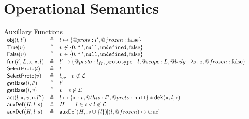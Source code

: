 \documentclass[a4paper]{article}
\begin{document}
\section{Operational Semantics}
\newcommand{\auxf}[2]{#1 & \triangleq & #2}
\begin{display}{Auxillary Functions}
  $\begin{array}{lcl}
  \auxf{\obj(l,l')}{l \pointsto \{@proto: l', @frozen: \false\}}\\
  \auxf{\istrue(v)}{v\not\in\{0,\emptystr,\nil,\und,\false\}}\\
  \auxf{\isfalse(v)}{v\in   \{0,\emptystr,\nil,\und,\false\}}\\
  \auxf{\fun(l',L,\js x,\js e,l)}{l'\mapsto\{@proto: \lfp, \js{prototype}:
    l, @scope: L, @body: \lambda \js{x.e}, @frozen: \false\}}\\
  \auxf{\objOrGlob(l)}{l}\\
  \auxf{\objOrGlob(v)}{\lop \quad v\not\in\loc}\\
  \auxf{\getBase(l,l')}{l'}\\
  \auxf{\getBase(l,v)}{v \quad v\not\in\loc}\\
  \auxf{\act(l,\js{x},v,\js{e},l'')}{l\pointsto\{\js{x}:
    v,@this: l'',@proto: \nil\}\sep \defs(\js{x},l,\js{e})}\\
  \auxf{\auxDef(H,l,s)}{H \qquad l \in s \lor l \not\in \loc}\\
  \auxf{\auxDef(H,l,s)}{\auxDef(H,,s \cup\{l\})[(l,@frozen) \mapsto \true]}
  \end{array}$
\end{display}
\end{document}

